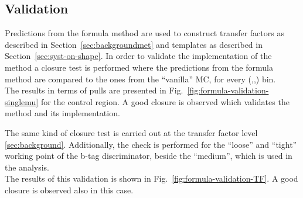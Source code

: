 \subsection{Validation}
\label{sec:formula-validation}

Predictions from the formula method are used to construct transfer 
factors as described in Section~\ref{sec:backgroundmet} and \mht templates 
as described in Section~\ref{sec:syst-on-shape}. 
In order to validate the implementation of the method 
a closure test is performed where the predictions from the formula method 
are compared to the ones from the ``vanilla'' MC, for every 
(\njet,\scalht,\mht) bin. \\
The results in terms of pulls are presented in Fig.~\ref{fig:formula-validation-singlemu} for the \mj control region. 
A good closure is observed which validates the method and its implementation.

The same kind of closure test is carried out at the transfer factor level \ref{sec:background}. %
Additionally, the check is performed for the ``loose'' and ``tight'' working point of the b-tag discriminator, 
beside the ``medium'', which is used in the analysis. \\
The results of this validation is shown in Fig.~\ref{fig:formula-validation-TF}. 
A good closure is observed also in this case. 

